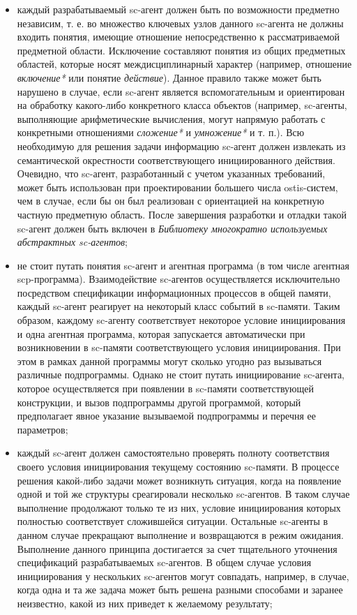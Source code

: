 \begin{itemize}
\item каждый разрабатываемый sc-агент должен быть по возможности предметно независим, т. е. во множество ключевых узлов данного sc-агента не должны входить понятия, имеющие отношение непосредственно к рассматриваемой предметной области. Исключение составляют понятия из общих предметных областей, которые носят междисциплинарный характер (например, отношение \textit{включение*} или понятие \textit{действие}). Данное правило также может быть нарушено в случае, если sc-агент является вспомогательным и ориентирован на обработку какого-либо конкретного класса объектов (например, sc-агенты, выполняющие арифметические вычисления, могут напрямую работать с конкретными отношениями \textit{сложение*} и \textit{умножение*} и т. п.). Всю необходимую для решения задачи информацию sc-агент должен извлекать из семантической окрестности соответствующего инициированного действия. Очевидно, что sc-агент, разработанный с учетом указанных требований, может быть использован при проектировании большего числа ostis-систем, чем в случае, если бы он был реализован с ориентацией на конкретную частную предметную область. После завершения разработки и отладки такой sc-агент должен быть включен в \textit{Библиотеку многократно используемых абстрактных sc-агентов};
\item не стоит путать понятия sc-агент и агентная программа (в том числе агентная scp-программа). Взаимодействие sc-агентов осуществляется исключительно посредством спецификации информационных процессов в общей памяти, каждый sc-агент реагирует на некоторый класс событий в sc-памяти. Таким образом, каждому sc-агенту соответствует некоторое условие инициирования и одна агентная программа, которая запускается автоматически при возникновении в sc-памяти соответствующего условия инициирования. При этом в рамках данной программы могут сколько угодно раз вызываться различные подпрограммы. Однако не стоит путать инициирование sc-агента, которое осуществляется при появлении в sc-памяти соответствующей конструкции, и вызов подпрограммы другой программой, который предполагает явное указание вызываемой подпрограммы и перечня ее параметров;
\item каждый sc-агент должен самостоятельно проверять полноту соответствия своего условия инициирования текущему состоянию sc-памяти. В процессе решения какой-либо задачи может возникнуть ситуация, когда на появление одной и той же структуры среагировали несколько sc-агентов. В таком случае выполнение продолжают только те из них, условие инициирования которых полностью соответствует сложившейся ситуации. Остальные sc-агенты в данном случае прекращают выполнение и возвращаются в режим ожидания. Выполнение данного принципа достигается за счет тщательного уточнения спецификаций разрабатываемых sc-агентов. В общем случае условия инициирования у нескольких sc-агентов могут совпадать, например, в случае, когда одна и та же задача может быть решена разными способами и заранее неизвестно, какой из них приведет к желаемому результату;

\end{itemize}
